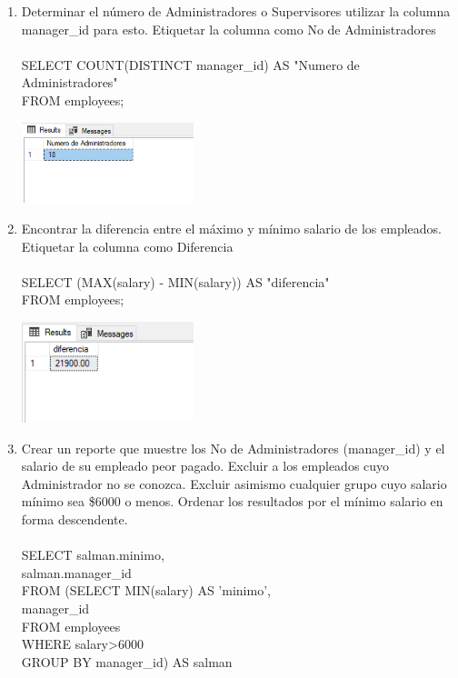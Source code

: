 \begin{enumerate}[1.]
\begin{center}
	\end{center}
	\item Determinar el n\'umero de Administradores o Supervisores utilizar la columna manager\_id para esto. Etiquetar la columna como No de Administradores
	\\	
	\\SELECT COUNT(DISTINCT manager\_id) AS "Numero de Administradores"
	\\FROM employees;
	\begin{center}
	\includegraphics[width=5cm]{./Imagenes/Imagen03_Act07} 
	\end{center}
	\item Encontrar la diferencia entre el m\'aximo y m\'inimo salario de los empleados. Etiquetar la columna como Diferencia
	\\
	\\SELECT (MAX(salary) - MIN(salary)) AS "diferencia"
	\\FROM employees;
	\begin{center}
	\includegraphics[width=5cm]{./Imagenes/Imagen04_Act07} 
	\end{center}
	\item Crear un reporte que muestre los No de Administradores (manager\_id) y el salario de su empleado peor pagado. Excluir a los empleados cuyo Administrador no se conozca. Excluir asimismo cualquier grupo cuyo salario mínimo sea \$6000 o menos. Ordenar los resultados por el mínimo salario en forma descendente.
	\\
	\\SELECT salman.minimo,
	\\salman.manager\_id
	\\FROM (SELECT MIN(salary) AS 'minimo',
	\\manager\_id
	\\FROM employees
	\\WHERE salary>6000
	\\GROUP BY manager\_id) AS salman

\end{enumerate}
